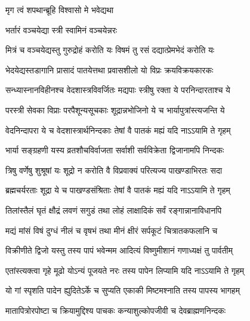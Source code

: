 

\onelineshloka
{मृग त्वं शपथान्ब्रूहि विश्वासो मे भवेद्यथा}%




\onelineshloka
{भर्तारं वञ्चयेद्या स्त्री स्वामिनं वञ्चयेन्नरः}%

\twolineshloka
{मित्रं च वञ्चयेद्यस्तु गुरुद्रोहं करोति यः}
{विषमं तु\footnotemark{} रसं दद्यात्प्रेमभेदं करोति यः}%

\twolineshloka
{भेदयेद्यस्तडागानि प्रासादं पातयेत्तथा}
{प्रवासशीलो यो विप्रः क्रयविक्रयकारकः}%

\twolineshloka
{सन्ध्यास्नानविहीनश्च वेदशास्त्रविवर्जितः}
{मद्यपाः स्त्रीषु रक्ता ये परनिन्दारताश्च ये}%

\twolineshloka
{परस्त्री सेवका विप्राः परपैशून्यसूचकाः}
{शूद्रान्नभोजिनो ये च भार्यापुत्रांस्त्यजन्ति ये}%

\twolineshloka
{वेदनिन्दापरा ये च वेदशास्त्रार्थनिन्दकाः}
{तेषां वै पातकं मह्यं यदि नाऽऽयामि ते गृहम्}%

\twolineshloka
{भार्या सङ्ग्रहणी यस्य व्रतशौचविर्वाजता}
{सर्वाशी सर्वविक्रेता द्विजानामपि निन्दकः}%

\twolineshloka
{त्रिषु वर्णेषु शुश्रूषां यः शूद्रो न करोति वै}
{विप्रवाक्यं परित्यज्य पाखण्डाभिरतः सदा}%

\twolineshloka
{ब्रह्मचर्यरताः शूद्रा ये च पाखण्डसंश्रिताः}
{तेषां वै पातकं मह्यं यदि नाऽऽयामि ते गृहम्}%

\twolineshloka
{तिलांस्तैलं घृतं क्षौद्रं लवणं सगुडं तथा}
{लोहं लाक्षादिकं सर्वं रङ्गान्नानाविधानपि}%

\twolineshloka
{मद्यं मांसं विषं दुग्धं नीलं च वृषभं तथा}
{मीनं क्षीरं सर्पकूटं चित्रातकफलानि च}%

\twolineshloka
{विक्रीणीते द्विजो यस्तु तस्य पापं भवेन्मम}
{आदित्यं विष्णुमीशानं गणाध्यक्षं तु पार्वतीम्}%

\twolineshloka
{एतांस्त्यक्त्वा गृहे मूढो योऽन्यं पूजयते नरः}
{तस्य पापेन लिप्यामि यदि नाऽऽयामि ते गृहम्}%

\twolineshloka
{यो गां स्पृशति पादेन ह्युदितेऽर्के च सुप्यति}
{एकाकी मिष्टमश्नाति तस्य पापस्य भागहम्}%

\twolineshloka
{मातापित्रोरपोष्टा च क्रियामुद्दिश्य\footnotemark{} पाचकः}
{कन्याशुल्कोपजीवी च देवब्राह्मणनिन्दकः}%


